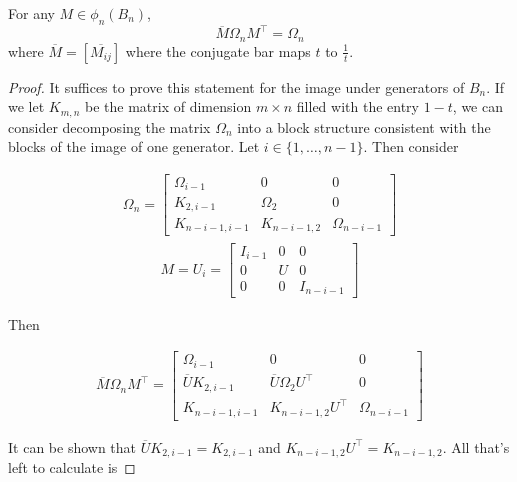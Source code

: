 \begin{theorem}
	For any $M\in \phi_n(B_n)$, 
$$\overline{M}\Omega_nM^\intercal = \Omega_n$$
where $\overline{M}=[\overline{M_{ij}}]$ where the conjugate bar maps $t$ to $\frac{1}{t}$.
\end{theorem}

\noindent\begin{proof}\cite{Kassel}  It suffices to prove this statement for the image under generators of $B_n$. If we let $K_{m,n}$ be the matrix of dimension $m\times n$ filled with the entry $1-t$, we can consider decomposing the matrix $\Omega_n$ into a block structure consistent with the blocks of the image of one generator. Let $i\in\{1,\hdots,n-1\}$. Then consider 

\begin{equation}
	\begin{aligned}
		\Omega_n = \begin{bmatrix}
							\Omega_{i-1} & 0 & 0\\
							K_{2,i-1} & \Omega_2 & 0 \\
							K_{n-i-1,i-1}& K_{n-i-1,2}&\Omega_{n-i-1}
						\end{bmatrix}
	\end{aligned}
\end{equation}
\begin{equation}
	\begin{aligned}
		M = U_i = \begin{bmatrix}
							I_{i-1} & 0 & 0\\
							0 & U & 0 \\
							0& 0&I_{n-i-1}
						\end{bmatrix}
	\end{aligned}
\end{equation}

Then

\begin{equation}
	\begin{aligned}
		\overline{M}\Omega_nM^\intercal = \begin{bmatrix}
														\Omega_{i-1} & 0 & 0\\
														\overline{U}K_{2,i-1} & \overline{U}\Omega_2U^\intercal & 0 \\
														K_{n-i-1,i-1}& K_{n-i-1,2}U^\intercal&\Omega_{n-i-1}
													\end{bmatrix}
	\end{aligned}
\end{equation}

It can be shown that $\overline{U}K_{2,i-1} = K_{2,i-1}$ and $K_{n-i-1,2}U^\intercal=K_{n-i-1,2}$. All that's left to calculate is 



\end{proof}
